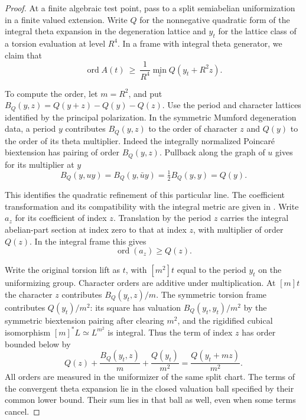 \begin{proof}
At a finite algebraic test point, pass to a split semiabelian
uniformization in a finite valued extension. Write \(Q\) for
the nonnegative quadratic form of the integral theta expansion in
the degeneration lattice and \(y_t\) for the lattice class of a torsion evaluation at level \(R^4\). In a frame with integral theta
generator, we claim that
\[
       \operatorname{ord} A(t)
       \ \ge\ \frac{1}{R^4}
                   \min_z Q(y_t+R^2z).
\]

To compute the order, let \(m=R^2\), and put
\(B_Q(y,z)=Q(y+z)-Q(y)-Q(z)\). Use the period and character
lattices identified by the principal polarization. In the symmetric
Mumford degeneration data, a period \(y\) contributes
\(B_Q(y,z)\) to the order of character \(z\) and \(Q(y)\) to
the order of its theta multiplier. Indeed the integrally normalized Poincar\'e
biextension has pairing of order \(B_Q(y,z)\). Pullback along
the graph of \(u\) gives for its multiplier at \(y\)
\[
 B_Q(y,uy)=B_Q(y,\bar u y)=\tfrac12B_Q(y,y)=Q(y).
\]

This identifies the quadratic refinement of this particular line.
The coefficient transformation and its compatibility with the
integral metric are given in
\cite[Proposition~3.19 and Corollary~3.21]{frss-nonarch-theta}. Write \(a_z\) for its coefficient of index \(z\).
Translation by the period \(z\) carries the integral abelian-part
section at index zero to that at index \(z\), with multiplier
of order \(Q(z)\). In the integral frame this gives
\[
                 \operatorname{ord}(a_z)\ge Q(z).
\]

Write the original torsion lift as \(t\), with \([m^2]t\) equal
to the period \(y_t\) on the uniformizing group. Character orders
are additive under multiplication. At \([m]t\) the character
\(z\) contributes \(B_Q(y_t,z)/m\). The symmetric torsion frame
contributes \(Q(y_t)/m^2\): its square has valuation
\(B_Q(y_t,y_t)/m^2\) by the symmetric biextension pairing after clearing \(m^2\),
and the rigidified cubical isomorphism \([m]^*L\simeq L^{m^2}\) is integral. Thus
the term of index \(z\) has order bounded below by
\[
 Q(z)+\frac{B_Q(y_t,z)}m+\frac{Q(y_t)}{m^2}
       =\frac{Q(y_t+mz)}{m^2}.
\]
All orders are measured in the uniformizer of the same split chart.
The terms of the convergent theta expansion lie in the closed
valuation ball specified by their common lower bound. Their sum
lies in that ball as well, even when some terms cancel.


\end{proof}
